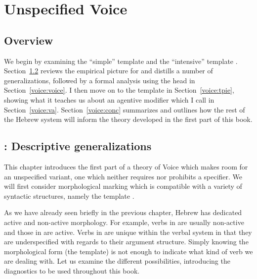 \chapter{Unspecified Voice}
\label{chap:voice}

\section{Overview} \label{voice:intro}
We begin by examining the ``simple'' template {\tkal} and the ``intensive'' template {\tpie}. Section~\ref{voice:tkal} reviews the empirical picture for {\tkal} and distills a number of generalizations, followed by a formal analysis using the  head in Section~\ref{voice:voice}. I then move on to the template {\tpie} in Section~\ref{voice:tpie}, showing what it teaches us about an agentive modifier which I call {\va} in Section~\ref{voice:va}. Section~\ref{voice:conc} summarizes and outlines how the rest of the Hebrew system will inform the theory developed in the first part of this book.

\section{\tkal: Descriptive generalizations} \label{voice:tkal}
This chapter introduces the first part of a theory of Voice which makes room for an unspecified variant, one which neither requires nor prohibits a specifier. We will first consider morphological marking which is compatible with a variety of syntactic structures, namely the template {\tkal}.

As we have already seen briefly in the previous chapter, Hebrew has dedicated active and non-active morphology. For example, verbs in {\tnif} are usually non-active and those in {\thif} are active. Verbs in {\tkal} are unique within the verbal system in that they are underspecified with regards to their argument structure. Simply knowing the morphological form (the template) is not enough to indicate what kind of verb we are dealing with. Let us examine the different possibilities, introducing the diagnostics to be used throughout this book.

